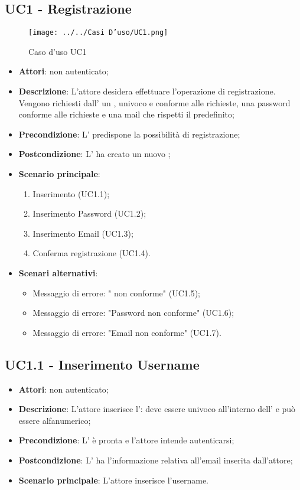 \subsection{UC1 - Registrazione}
\label{ssec:UC1}
\begin{figure}[h!]
\centering
\texttt{[image: ../../Casi D'uso/UC1.png]}
\caption{Caso d'uso UC1}
 \end{figure}
\begin{itemize}
\item \textbf{Attori}:  non autenticato;
\item \textbf{Descrizione}: L'attore desidera effettuare l'operazione di registrazione. Vengono richiesti dall' un , univoco e conforme alle richieste, una password conforme alle richieste e una mail che rispetti il  predefinito;
\item \textbf{Precondizione}: L' predispone la possibilità di registrazione;
\item \textbf{Postcondizione}: L' ha creato un nuovo  ;
\item \textbf{Scenario principale}: \begin{enumerate}\item Inserimento  (UC1.1);\item Inserimento Password (UC1.2);\item Inserimento Email (UC1.3);\item Conferma registrazione (UC1.4).
\end{enumerate}
\item \textbf{Scenari alternativi}:
	\begin{itemize}
	\item Messaggio di errore: " non conforme" (UC1.5);\item Messaggio di errore: "Password non conforme" (UC1.6);\item Messaggio di errore: "Email non conforme" (UC1.7).
	\end{itemize}
\end{itemize}
\subsection{UC1.1 - Inserimento Username}
\label{ssec:UC1.1}
\begin{itemize}
\item \textbf{Attori}:  non autenticato;
\item \textbf{Descrizione}: L’attore inserisce l': deve essere univoco all'interno dell' e può essere alfanumerico;
\item \textbf{Precondizione}: L' è pronta e l'attore intende autenticarsi;
\item \textbf{Postcondizione}: L' ha l’informazione relativa all'email inserita dall’attore;
\item \textbf{Scenario principale}: L'attore inserisce l'username.
\end{itemize}
